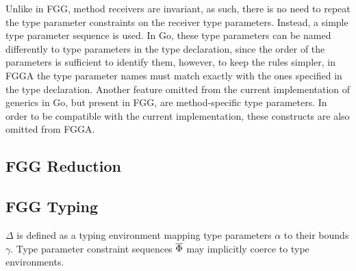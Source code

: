 Unlike in FGG, method receivers are invariant, as such, there is no need to
repeat the type parameter constraints on the receiver type parameters. Instead,
a simple type parameter sequence is used. In Go, these type parameters can be
named differently to type parameters in the type declaration, since the order of
the parameters is sufficient to identify them, however, to keep the rules
simpler, in FGGA the type parameter names must match exactly with the ones
specified in the type declaration. Another feature omitted from the current
implementation of generics in Go, but present in FGG, are method-specific type
parameters. In order to be compatible with the current implementation, these
constructs are also omitted from FGGA.



\subsection{FGG Reduction}



\subsection{FGG Typing}

$\Delta$ is defined as a typing environment mapping type parameters $\alpha$
to their bounds $\gamma$. Type parameter constraint sequences $\overline{\Phi}$ may
implicitly coerce to type environments.



